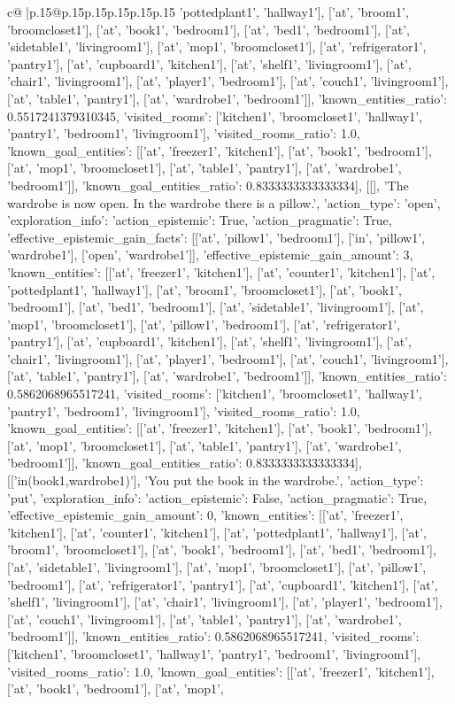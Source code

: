 \documentclass{article}
\begin{document}
{\begin{supertabular}{c@{$\;$}|p{.15\linewidth}@{}p{.15\linewidth}p{.15\linewidth}p{.15\linewidth}p{.15\linewidth}p{.15\linewidth}}
{{{'pottedplant1', 'hallway1'], ['at', 'broom1', 'broomcloset1'], ['at', 'book1', 'bedroom1'], ['at', 'bed1', 'bedroom1'], ['at', 'sidetable1', 'livingroom1'], ['at', 'mop1', 'broomcloset1'], ['at', 'refrigerator1', 'pantry1'], ['at', 'cupboard1', 'kitchen1'], ['at', 'shelf1', 'livingroom1'], ['at', 'chair1', 'livingroom1'], ['at', 'player1', 'bedroom1'], ['at', 'couch1', 'livingroom1'], ['at', 'table1', 'pantry1'], ['at', 'wardrobe1', 'bedroom1']], 'known_entities_ratio': 0.5517241379310345, 'visited_rooms': ['kitchen1', 'broomcloset1', 'hallway1', 'pantry1', 'bedroom1', 'livingroom1'], 'visited_rooms_ratio': 1.0, 'known_goal_entities': [['at', 'freezer1', 'kitchen1'], ['at', 'book1', 'bedroom1'], ['at', 'mop1', 'broomcloset1'], ['at', 'table1', 'pantry1'], ['at', 'wardrobe1', 'bedroom1']], 'known_goal_entities_ratio': 0.8333333333333334}}], [[], 'The wardrobe is now open. In the wardrobe there is a pillow.', {'action_type': 'open', 'exploration_info': {'action_epistemic': True, 'action_pragmatic': True, 'effective_epistemic_gain_facts': [['at', 'pillow1', 'bedroom1'], ['in', 'pillow1', 'wardrobe1'], ['open', 'wardrobe1']], 'effective_epistemic_gain_amount': 3, 'known_entities': [['at', 'freezer1', 'kitchen1'], ['at', 'counter1', 'kitchen1'], ['at', 'pottedplant1', 'hallway1'], ['at', 'broom1', 'broomcloset1'], ['at', 'book1', 'bedroom1'], ['at', 'bed1', 'bedroom1'], ['at', 'sidetable1', 'livingroom1'], ['at', 'mop1', 'broomcloset1'], ['at', 'pillow1', 'bedroom1'], ['at', 'refrigerator1', 'pantry1'], ['at', 'cupboard1', 'kitchen1'], ['at', 'shelf1', 'livingroom1'], ['at', 'chair1', 'livingroom1'], ['at', 'player1', 'bedroom1'], ['at', 'couch1', 'livingroom1'], ['at', 'table1', 'pantry1'], ['at', 'wardrobe1', 'bedroom1']], 'known_entities_ratio': 0.5862068965517241, 'visited_rooms': ['kitchen1', 'broomcloset1', 'hallway1', 'pantry1', 'bedroom1', 'livingroom1'], 'visited_rooms_ratio': 1.0, 'known_goal_entities': [['at', 'freezer1', 'kitchen1'], ['at', 'book1', 'bedroom1'], ['at', 'mop1', 'broomcloset1'], ['at', 'table1', 'pantry1'], ['at', 'wardrobe1', 'bedroom1']], 'known_goal_entities_ratio': 0.8333333333333334}}], [['in(book1,wardrobe1)'], 'You put the book in the wardrobe.', {'action_type': 'put', 'exploration_info': {'action_epistemic': False, 'action_pragmatic': True, 'effective_epistemic_gain_amount': 0, 'known_entities': [['at', 'freezer1', 'kitchen1'], ['at', 'counter1', 'kitchen1'], ['at', 'pottedplant1', 'hallway1'], ['at', 'broom1', 'broomcloset1'], ['at', 'book1', 'bedroom1'], ['at', 'bed1', 'bedroom1'], ['at', 'sidetable1', 'livingroom1'], ['at', 'mop1', 'broomcloset1'], ['at', 'pillow1', 'bedroom1'], ['at', 'refrigerator1', 'pantry1'], ['at', 'cupboard1', 'kitchen1'], ['at', 'shelf1', 'livingroom1'], ['at', 'chair1', 'livingroom1'], ['at', 'player1', 'bedroom1'], ['at', 'couch1', 'livingroom1'], ['at', 'table1', 'pantry1'], ['at', 'wardrobe1', 'bedroom1']], 'known_entities_ratio': 0.5862068965517241, 'visited_rooms': ['kitchen1', 'broomcloset1', 'hallway1', 'pantry1', 'bedroom1', 'livingroom1'], 'visited_rooms_ratio': 1.0, 'known_goal_entities': [['at', 'freezer1', 'kitchen1'], ['at', 'book1', 'bedroom1'], ['at', 'mop1', }}}
\end{supertabular}}
\end{document}
